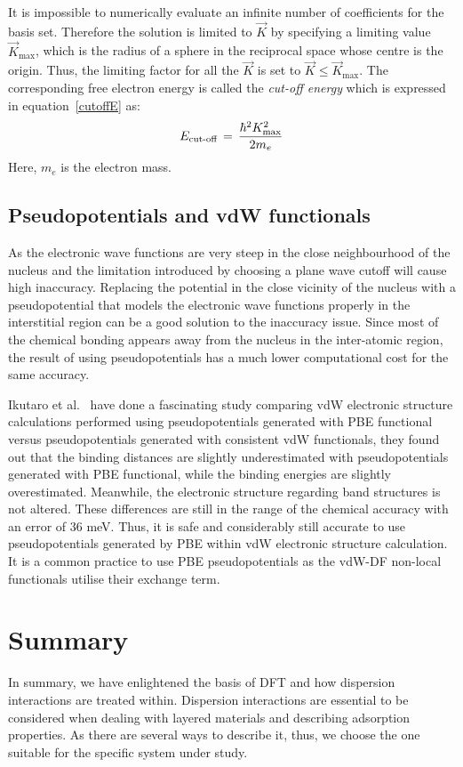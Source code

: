 It is impossible to numerically evaluate an infinite number of coefficients for the basis set. Therefore the solution is limited to $\vec{K}$ by specifying a limiting value $\vec{K}_{\text{max}}$, which is the radius of a sphere in the reciprocal space whose centre is the origin. Thus, the limiting factor for all the $\vec{K}$ is set to $\vec{K} \leq \vec{K}_{\text{max}}$. The corresponding free electron energy is called the \textit{cut-off energy} which is expressed in equation~\ref{cutoffE} as:
\begin{equation}
E_{\text{cut-off}} \, = \, {{\hbar^2 K_{\text{max}}^2}\over{2m_e}}
\label{cutoffE}
\end{equation}
Here, $m_e$ is the electron mass.
\subsection{Pseudopotentials and vdW functionals}
As the electronic wave functions are very steep in the close neighbourhood of the nucleus and the limitation introduced by choosing a plane wave cutoff will cause high inaccuracy. Replacing the potential in the close vicinity of the nucleus with a pseudopotential that models the electronic wave functions properly in the interstitial region can be a good solution to the inaccuracy issue. Since most of the chemical bonding appears away from the nucleus in the inter-atomic region, the result of using pseudopotentials has a much lower computational cost for the same accuracy.

Ikutaro et al.~\cite{Ikutaro2011} have done a fascinating study comparing vdW electronic structure calculations performed using pseudopotentials generated with PBE functional versus pseudopotentials generated with consistent vdW functionals, they found out that the binding distances are slightly underestimated with pseudopotentials generated with PBE functional, while the binding energies are slightly overestimated. Meanwhile, the electronic structure regarding band structures is not altered. These differences are still in the range of the chemical accuracy with an error of 36 meV. Thus, it is safe and considerably still accurate to use pseudopotentials generated by PBE within vdW electronic structure calculation. It is a common practice to use PBE pseudopotentials as the vdW-DF non-local functionals utilise their exchange term.
\section{Summary}
In summary, we have enlightened the basis of DFT and how dispersion interactions are treated within. Dispersion interactions are essential to be considered when dealing with layered materials and describing adsorption properties. As there are several ways to describe it, thus, we choose the one suitable for the specific system under study.
\endinput